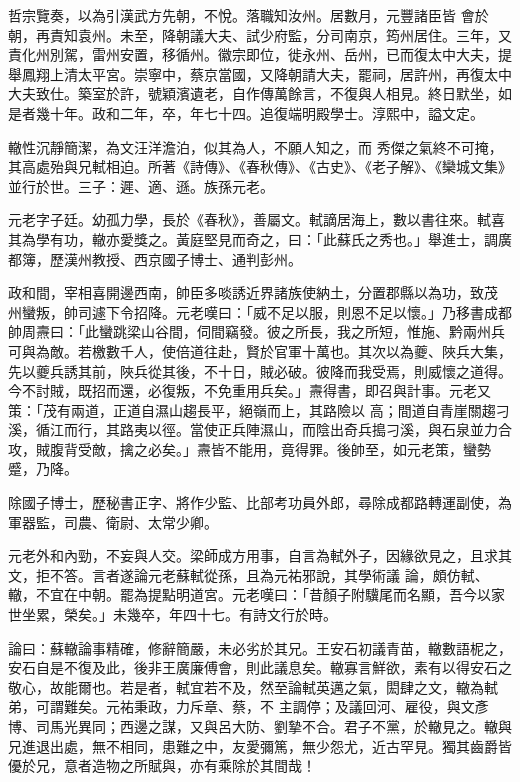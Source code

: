 \begin{pinyinscope}
 哲宗覽奏，以為引漢武方先朝，不悅。落職知汝州。居數月，元豐諸臣皆
 會於朝，再責知袁州。未至，降朝議大夫、試少府監，分司南京，筠州居住。三年，又責化州別駕，雷州安置，移循州。徽宗即位，徙永州、岳州，已而復太中大夫，提舉鳳翔上清太平宮。崇寧中，蔡京當國，又降朝請大夫，罷祠，居許州，再復太中大夫致仕。築室於許，號穎濱遺老，自作傳萬餘言，不復與人相見。終日默坐，如是者幾十年。政和二年，卒，年七十四。追復端明殿學士。淳熙中，謚文定。



 轍性沉靜簡潔，為文汪洋澹泊，似其為人，不願人知之，而
 秀傑之氣終不可掩，其高處殆與兄軾相迫。所著《詩傳》、《春秋傳》、《古史》、《老子解》、《欒城文集》並行於世。三子：遲、適、遜。族孫元老。



 元老字子廷。幼孤力學，長於《春秋》，善屬文。軾謫居海上，數以書往來。軾喜其為學有功，轍亦愛獎之。黃庭堅見而奇之，曰：「此蘇氏之秀也。」舉進士，調廣都簿，歷漢州教授、西京國子博士、通判彭州。



 政和間，宰相喜開邊西南，帥臣多啖誘近界諸族使納土，分置郡縣以為功，致茂
 州蠻叛，帥司遽下令招降。元老嘆曰：「威不足以服，則恩不足以懷。」乃移書成都帥周燾曰：「此蠻跳梁山谷間，伺間竊發。彼之所長，我之所短，惟施、黔兩州兵可與為敵。若檄數千人，使倍道往赴，賢於官軍十萬也。其次以為夔、陜兵大集，先以夔兵誘其前，陜兵從其後，不十日，賊必破。彼降而我受焉，則威懷之道得。今不討賊，既招而還，必復叛，不免重用兵矣。」燾得書，即召與計事。元老又策：「茂有兩道，正道自濕山趨長平，絕嶺而上，其路險以
 高；間道自青崖關趨刁溪，循江而行，其路夷以徑。當使正兵陣濕山，而陰出奇兵搗刁溪，與石泉並力合攻，賊腹背受敵，擒之必矣。」燾皆不能用，竟得罪。後帥至，如元老策，蠻勢蹙，乃降。



 除國子博士，歷秘書正字、將作少監、比部考功員外郎，尋除成都路轉運副使，為軍器監，司農、衛尉、太常少卿。



 元老外和內勁，不妄與人交。梁師成方用事，自言為軾外子，因緣欲見之，且求其文，拒不答。言者遂論元老蘇軾從孫，且為元祐邪說，其學術議
 論，頗仿軾、轍，不宜在中朝。罷為提點明道宮。元老嘆曰：「昔顏子附驥尾而名顯，吾今以家世坐累，榮矣。」未幾卒，年四十七。有詩文行於時。



 論曰：蘇轍論事精確，修辭簡嚴，未必劣於其兄。王安石初議青苗，轍數語柅之，安石自是不復及此，後非王廣廉傅會，則此議息矣。轍寡言鮮欲，素有以得安石之敬心，故能爾也。若是者，軾宜若不及，然至論軾英邁之氣，閎肆之文，轍為軾弟，可謂難矣。元祐秉政，力斥章、蔡，不
 主調停；及議回河、雇役，與文彥博、司馬光異同；西邊之謀，又與呂大防、劉摯不合。君子不黨，於轍見之。轍與兄進退出處，無不相同，患難之中，友愛彌篤，無少怨尤，近古罕見。獨其齒爵皆優於兄，意者造物之所賦與，亦有乘除於其間哉！



\end{pinyinscope}